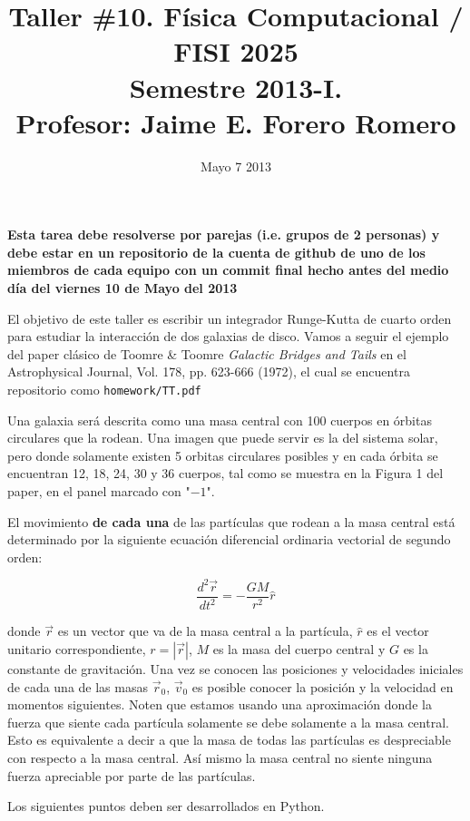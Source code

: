 \documentclass{article}
\title{Taller \#10. F\'isica Computacional / FISI 2025 \\Semestre
  2013-I. \\ Profesor: Jaime E. Forero Romero}
\date{Mayo 7 2013}
\begin{document}
\maketitle

{\bf Esta tarea debe resolverse por parejas (i.e. grupos de 2
  personas) y debe estar en un repositorio de la cuenta de github de
  uno de los miembros de cada equipo con un commit final hecho antes del
  medio d\'ia del viernes 10 de Mayo del 2013}  


El objetivo de este taller es escribir un integrador Runge-Kutta de
cuarto orden para estudiar la interacci\'on de dos galaxias de disco. Vamos a
seguir el ejemplo  del paper cl\'asico de Toomre \& Toomre
\textit{Galactic Bridges and Tails} en el Astrophysical Journal, Vol. 178,
pp. 623-666 (1972), el cual se encuentra repositorio como
\verb"homework/TT.pdf" 

Una galaxia ser\'a descrita como una masa central con 100
cuerpos en \'orbitas circulares que la rodean. Una imagen que puede
servir es la del sistema solar, pero donde solamente existen 5 orbitas
circulares posibles y en cada \'orbita se encuentran 12, 18, 24, 30 y 36
cuerpos, tal como se muestra en la Figura 1 del paper, en el panel
marcado con "$-1$". 

El movimiento {\bf de cada una} de las part\'iculas que rodean a la masa
central est\'a determinado por la siguiente ecuaci\'on diferencial
ordinaria vectorial de segundo orden: 
 

\begin{equation}
\frac{d^2\vec{r}}{dt^2} = -\frac{GM}{r^2} \hat{r}
\end{equation}

donde $\vec{r}$  es un vector que va de la masa central a la
part\'icula, $\hat{r}$ es el vector unitario correspondiente,
$r=|\vec{r}|$, $M$ es la masa del cuerpo central y $G$ es la constante
de gravitaci\'on.  Una vez se conocen las posiciones y velocidades
iniciales de
cada una de las masas $\vec{r}_0$, $\vec{v}_0$ es posible conocer la
  posici\'on y la velocidad en momentos siguientes. Noten que estamos usando una
  aproximaci\'on donde la fuerza que siente cada part\'icula solamente
  se debe solamente a la masa central. Esto es equivalente a decir a
  que la masa de todas las part\'iculas es despreciable con respecto a
  la masa central. As\'i mismo la masa central no siente ninguna
  fuerza apreciable por parte de las part\'iculas.

Los siguientes puntos deben ser desarrollados en Python.
\end{document}
